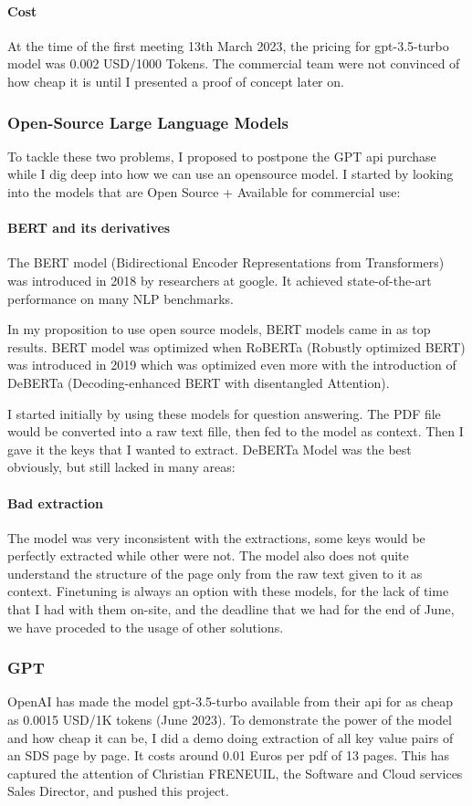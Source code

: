 \documentclass[a4paper,12pt,twoside]{report}
\begin{document}
\paragraph{Cost}
At the time of the first meeting 13th March 2023, the pricing for gpt-3.5-turbo model was 0.002 USD/1000 Tokens. The commercial team were not convinced of how cheap it is until I presented a proof of concept later on.
\subsubsection{Open-Source Large Language Models}
To tackle these two problems, I proposed to postpone the GPT api purchase while I dig deep into how we can use an opensource model. I started by looking into the models that are Open Source + Available for commercial use:
\paragraph{BERT and its derivatives}
The BERT model \cite{devlin2019bert} (Bidirectional Encoder Representations from Transformers) was introduced in 2018 by researchers at google. It achieved state-of-the-art performance on many NLP benchmarks. 

In my proposition to use open source models, BERT models came in as top results. BERT model was optimized when RoBERTa \cite{liu2019roberta} (Robustly optimized BERT) was introduced in 2019 which was optimized even more with the introduction of DeBERTa \cite{he2021deberta} (Decoding-enhanced BERT with disentangled Attention).

I started initially by using these models for question answering. The PDF file would be converted into a raw text fille, then fed to the model as context. Then I gave it the keys that I wanted to extract. DeBERTa Model was the best obviously, but still lacked in many areas:
\paragraph{Bad extraction}
The model was very inconsistent with the extractions, some keys would be perfectly extracted while other were not. The model also does not quite understand the structure of the page only from the raw text given to it as context.
Finetuning is always an option with these models, for the lack of time that I had with them on-site, and the deadline that we had for the end of June, we have proceded to the usage of other solutions.
\subsubsection{GPT}
OpenAI has made the model gpt-3.5-turbo available from their api for as cheap as 0.0015 USD/1K tokens (June 2023). To demonstrate the power of the model and how cheap it can be, I did a demo doing extraction of all key value pairs of an SDS page by page. It costs around 0.01 Euros per pdf of 13 pages. This has captured the attention of Christian FRENEUIL, the Software and Cloud services Sales Director, and pushed this project. 
\end{document}
